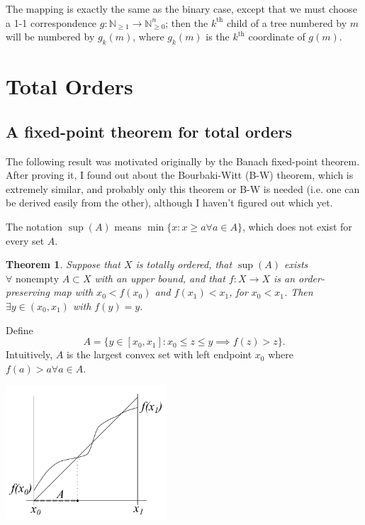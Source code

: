 \documentclass[11pt]{amsart}
\newtheorem{Thm}[Def]{Theorem}
\newcommand\bpf[1][]{\smallskip\noindent{\bf Proof#1.}\quad}
\newcommand\N{\mathbb N}
\begin{document}
The mapping is exactly the same as the binary case, except that
we must choose a 1-1 correspondence $g: \N_{\ge 1} \to \N^n_{\ge 0}$;
then the $k^\text{th}$ child of a tree numbered by $m$ will be
numbered by $g_k(m)$, where $g_k(m)$ is the  $k^\text{th}$ coordinate
of $g(m)$.

\section{Total Orders}

\subsection{A fixed-point theorem for total orders}

The following result was motivated originally by the
Banach fixed-point theorem. After proving it, I found out
about the Bourbaki-Witt (B-W) theorem, which is extremely similar,
and probably only this theorem or B-W is needed (i.e. one can be
derived easily from the other), although I haven't figured out which yet.

The notation $\sup (A)$ means $\min \{x : x \ge a \forall a \in A\}$,
which does not exist for every set $A$.

\begin{Thm}
Suppose that $X$ is totally ordered, that $\sup (A)$ exists
$\forall \text{ nonempty } A\subset X$ with an upper bound,
and that $f:X\to X$ is an
order-preserving map with $x_0 < f(x_0)$ and $f(x_1) < x_1$,
for $x_0 < x_1$. Then $\exists y \in (x_0, x_1)$ with $f(y) = y$.
\end{Thm}

\bpf
Define
$$ A = \{ y \in [x_0, x_1] : x_0 \le z \le y \implies f(z) > z \}. $$
Intuitively, $A$ is the largest convex set with left endpoint $x_0$
where $f(a) > a \forall a \in A$.


\centerline{
\includegraphics[width=6.0cm]{set_theory_ideas1.pdf}
}
\end{document}
